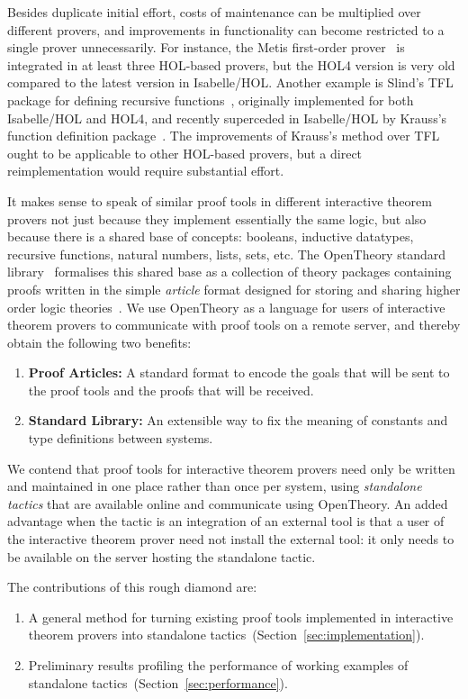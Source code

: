\documentclass{llncs}
\newcommand{\OpenTheory}{OpenTheory\xspace}
\newcommand{\secref}[1]{Section~\ref{sec:#1}}
\begin{document}
Besides duplicate initial effort, costs of maintenance can be multiplied over different provers, and improvements in functionality can become restricted to a single prover unnecessarily.
For instance, the Metis first-order prover~\cite{hurd2003d} is integrated in at least three HOL-based provers, but the HOL4 version is very old compared to the latest version in Isabelle/HOL.
Another example is Slind's TFL package for defining recursive functions~\cite{slindphd}, originally implemented for both Isabelle/HOL and HOL4, and recently superceded in Isabelle/HOL by Krauss's function definition package~\cite{DBLP:journals/jar/Krauss10}.
The improvements of Krauss's method over TFL ought to be applicable to other HOL-based provers, but a direct reimplementation would require substantial effort.

It makes sense to speak of similar proof tools in different interactive theorem provers not just because they implement essentially the same logic, but also because there is a shared base of concepts: booleans, inductive datatypes, recursive functions, natural numbers, lists, sets, etc.
The \OpenTheory standard library~\cite{hurd2011} formalises this shared base as a collection of theory packages containing proofs written in the simple \emph{article} format designed for storing and sharing higher order logic theories~\cite{hurd2009}.
We use \OpenTheory as a language for users of interactive theorem provers to communicate with proof tools on a remote server, and thereby obtain the following two benefits:
\begin{enumerate}
\item\textbf{Proof Articles:} A standard format to encode the goals that will be sent to the proof tools and the proofs that will be received.

\item\textbf{Standard Library:} An extensible way to fix the meaning of constants and type definitions between systems.
\end{enumerate}

We contend that proof tools for interactive theorem provers need only be written and maintained in one place rather than once per system, using \emph{standalone tactics} that are available online and communicate using \OpenTheory.
An added advantage when the tactic is an integration of an external tool is that a user of the interactive theorem prover need not install the external tool: it only needs to be available on the server hosting the standalone tactic.

The contributions of this rough diamond are:
\begin{enumerate}
\item A general method for turning existing proof tools implemented in interactive theorem provers into standalone tactics~(\secref{implementation}).

\item Preliminary results profiling the performance of working examples of standalone tactics~(\secref{performance}).
\end{enumerate}
\end{document}
